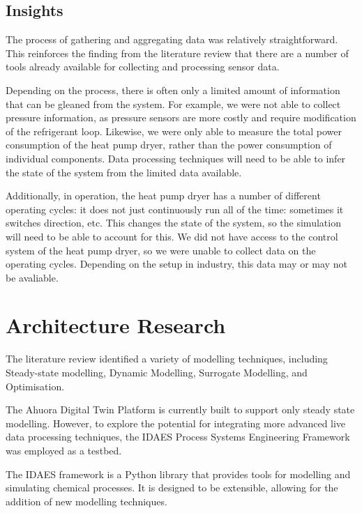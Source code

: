 \documentclass[12pt]{report}
\begin{document}
\section{Insights}

The process of gathering and aggregating data was relatively straightforward. This reinforces the finding from the literature review that there are a number of tools already available for collecting and processing sensor data. 

Depending on the process, there is often only a limited amount of information that can be gleaned from the system. For example, we were not able to collect pressure information, as pressure sensors are more costly and require modification of the refrigerant loop. Likewise, we were only able to measure the total power consumption of the heat pump dryer, rather than the power consumption of individual components. Data processing techniques will need to be able to infer the state of the system from the limited data available.

Additionally, in operation, the heat pump dryer has a number of different operating cycles: it does not just continuously run all of the time: sometimes it switches direction, etc. This changes the state of the system, so the simulation will need to be able to account for this. We did not have access to the control system of the heat pump dryer, so we were unable to collect data on the operating cycles. Depending on the setup in industry, this data may or may not be avaliable.




\chapter{Architecture Research} \label{sec:architectureresearch}

The literature review identified a variety of modelling techniques, including Steady-state modelling, Dynamic Modelling, Surrogate Modelling, and Optimisation. 

The Ahuora Digital Twin Platform is currently built to support only steady state modelling. However, to explore the potential for integrating more advanced live data processing techniques, the IDAES Process Systems Engineering Framework was employed as a testbed.

The IDAES framework is a Python library that provides tools for modelling and simulating chemical processes. It is designed to be extensible, allowing for the addition of new modelling techniques.
\end{document}
